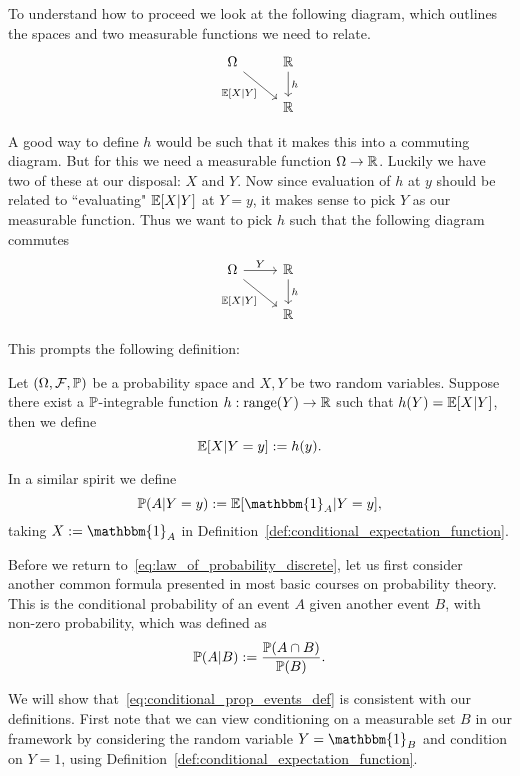 To understand how to proceed we look at the following diagram, which outlines the spaces and two measurable functions we need to relate.
\[
\begin{tikzcd}
	\Omega \arrow[dr,swap,"{\bbE[X|Y]}"] &\bbR \arrow[d,"h"]  \\
	&\bbR
\end{tikzcd}
\]

A good way to define $h$ would be such that it makes this into a commuting diagram. But for this we need a measurable function $\Omega \to \mathbb R$. Luckily we have two of these at our disposal: $X$ and $Y$. Now since evaluation of $h$ at $y$ should be related to ``evaluating" $\mathbb E[X|Y]$ at $Y = y$, it makes sense to pick $Y$ as our measurable function. Thus we want to pick $h$ such that the following diagram commutes
\[
\begin{tikzcd}
	\Omega \arrow[r,"Y"] \arrow[dr,swap,"{\bbE[X|Y]}"] &\bbR \arrow[d,"h"]  \\
	&\bbR
\end{tikzcd}
\]

This prompts the following definition:

\begin{definition}\label{def:conditional_expectation_function}
Let $(\Omega, \mathcal F, \mathbb P)$ be a probability space and $X, Y$ be two random variables. Suppose there exist a $\mathbb P$-integrable function $h : \mathrm{range}(Y) \to \mathbb R$ such that $h(Y) = \mathbb E[X | Y]$, then we define
\[
	\mathbb E[X | Y = y] := h(y).
\]
\end{definition}

In a similar spirit we define
\[
	\bbP(A | Y = y) := \bbE[\mathbbm{1}_A | Y = y],
\]
taking $X := \mathbbm{1}_A$ in Definition~\ref{def:conditional_expectation_function}.

Before we return to~\eqref{eq:law_of_probability_discrete}, let us first consider another common formula presented in most basic courses on probability theory. This is the conditional probability of an event $A$ given another event $B$, with non-zero probability, which was defined as
\begin{equation}\label{eq:conditional_prop_events_def}
	\mathbb P(A|B) := \frac{\mathbb P(A \cap B)}{\mathbb P(B)}.
\end{equation}

We will show that~\eqref{eq:conditional_prop_events_def} is consistent with our definitions. First note that we can view conditioning on a measurable set $B$ in our framework by considering the random variable $Y = \mathbbm{1}_B$ and condition on $Y = 1$, using Definition~\ref{def:conditional_expectation_function}.

